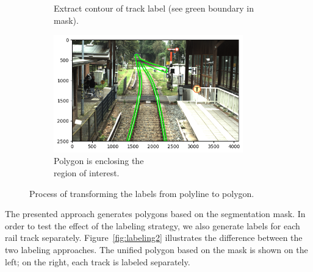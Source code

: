 \documentclass[Master,MDS,english]{BASE/twbook} %
\begin{document}
\begin{figure}[h]
\begin{subfigure}[t]{.5\textwidth}
  \caption{Extract contour of track label (see green boundary in mask).}
\end{subfigure}%
\begin{subfigure}[t]{.5\textwidth}
  \centering
  \includegraphics[width=0.9\textwidth]{images/labeling/final}
  \caption{Polygon is enclosing the \\ region of interest.}
\end{subfigure}
\caption{Process of transforming the labels from  polyline to polygon.}
\label{fig:labeling}
\end{figure}


The presented approach generates polygons based on the segmentation mask. In order to test the effect of the labeling strategy, we also generate labels for each rail track separately. Figure~\ref{fig:labeling2} illustrates the difference between the two labeling approaches. The unified polygon based on the mask is shown on the left; on the right, each track is labeled separately.
\end{document}
